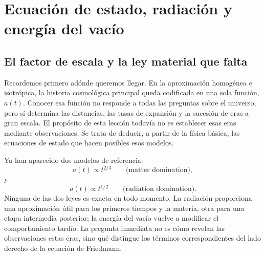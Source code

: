 \chapter{Ecuación de estado, radiación y energía del vacío}


\section{El factor de escala y la ley material que falta}

Recordemos primero adónde queremos llegar. En la aproximación homogénea e isotrópica, la historia cosmológica principal queda codificada en una sola función, \(a(t)\). Conocer esa función no responde a todas las preguntas sobre el universo, pero sí determina las distancias, las tasas de expansión y la sucesión de eras a gran escala. El propósito de esta lección todavía no es establecer esas eras mediante observaciones. Se trata de deducir, a partir de la física básica, las ecuaciones de estado que hacen posibles esos modelos.

Ya han aparecido dos modelos de referencia:
\begin{equation}
a(t)\propto t^{2/3}
\qquad\text{(matter domination)},
\end{equation}
y
\begin{equation}
a(t)\propto t^{1/2}
\qquad\text{(radiation domination)}.
\end{equation}
Ninguna de las dos leyes es exacta en todo momento. La radiación proporciona una aproximación útil para los primeros tiempos y la materia, otra para una etapa intermedia posterior; la energía del vacío vuelve a modificar el comportamiento tardío. La pregunta inmediata no es cómo revelan las observaciones estas eras, sino qué distingue los términos correspondientes del lado derecho de la ecuación de Friedmann.

